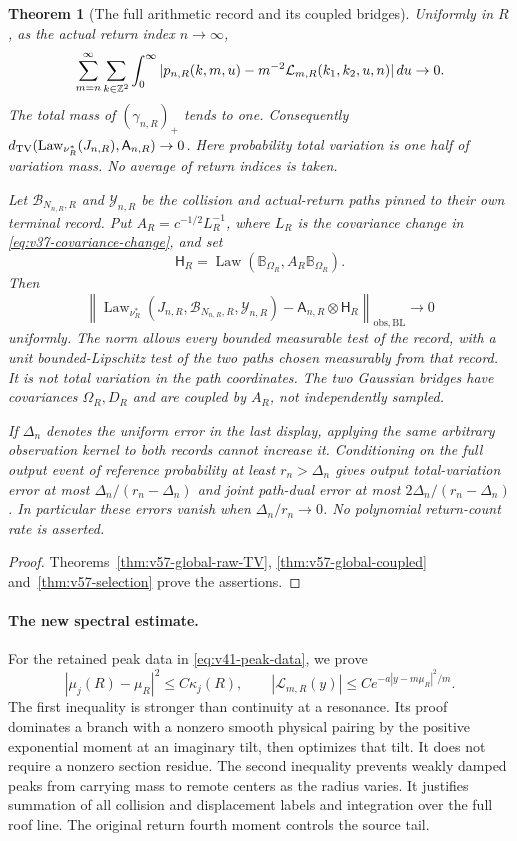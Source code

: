 \documentclass[11pt,reqno]{amsart}
\numberwithin{equation}{section}
\newtheorem{leadtheorem}{Theorem}
\theoremstyle{definition}\newtheorem{definition}[theorem]{Definition}
\theoremstyle{remark}\newtheorem{remark}[theorem]{Remark}
\begin{document}
\clearpage
\begin{leadtheorem}[The full arithmetic record and its coupled bridges]
\label{thm:intro-v57-global}
Uniformly in $R$, as the actual return index $n\to\infty$,
\[
 \sum_{m=n}^\infty\sum_{k\in\mathbb Z^2}\int_0^\infty
   |p_{n,R}(k,m,u)-m^{-2}\mathcal L_{m,R}(k_1,k_2,u,n)|\,du\to0.
\]
The total mass of $(\gamma_{n,R})_+$ tends to one. Consequently
$d_{\rm TV}(\operatorname{Law}_{\nu_R^*}(J_{n,R}),\mathsf A_{n,R})\to0$.
Here probability total variation is one half of variation mass.
No average of return indices is taken.

Let $\mathcal B_{N_{n,R},R}$ and $\mathcal Y_{n,R}$ be the collision
and actual-return paths pinned to their own terminal record. Put
$A_R=c^{-1/2}L_R^{-1}$, where $L_R$ is the covariance change in
\eqref{eq:v37-covariance-change}, and set
\[
 \mathsf H_R=\operatorname{Law}(\mathbb B_{\Omega_R},
                                      A_R\mathbb B_{\Omega_R}).
\]
Then
\[
 \left\|\operatorname{Law}_{\nu_R^*}
  (J_{n,R},\mathcal B_{N_{n,R},R},\mathcal Y_{n,R})
                 -\mathsf A_{n,R}\otimes\mathsf H_R
       \right\|_{\mathrm{obs},\mathrm{BL}}\to0
\]
uniformly. The norm allows every bounded measurable test of the record,
with a unit bounded-Lipschitz test of the two paths chosen measurably
from that record. It is not total variation in the path coordinates.
The two Gaussian bridges have covariances $\Omega_R,D_R$ and are
coupled by $A_R$, not independently sampled.

If $\Delta_n$ denotes the uniform error in the last display, applying
the same arbitrary observation kernel to both records cannot increase
it. Conditioning on the full output event of reference probability at
least $r_n>\Delta_n$ gives output total-variation error at most
$\Delta_n/(r_n-\Delta_n)$ and joint path-dual error at most
$2\Delta_n/(r_n-\Delta_n)$. In particular these errors vanish when
$\Delta_n/r_n\to0$. No polynomial return-count rate is asserted.
\end{leadtheorem}
\begin{proof}
Theorems~\ref{thm:v57-global-raw-TV}, \ref{thm:v57-global-coupled}
and~\ref{thm:v57-selection} prove the assertions.
\end{proof}

\paragraph{The new spectral estimate.}
For the retained peak data in \eqref{eq:v41-peak-data}, we prove
\[
 |\mu_j(R)-\mu_R|^2\le C\kappa_j(R),\qquad
 |\mathcal L_{m,R}(y)|\le C e^{-a|y-m\mu_R|^2/m}.
\]
The first inequality is stronger than continuity at a resonance. Its
proof dominates a branch with a nonzero smooth physical pairing by the
positive exponential moment at an imaginary tilt, then optimizes that
tilt. It does not require a nonzero section residue. The second
inequality prevents weakly damped peaks from carrying mass to remote
centers as the radius varies. It justifies summation of all collision
and displacement labels and integration over the full roof line.
The original return fourth moment controls the source tail.
\end{document}
